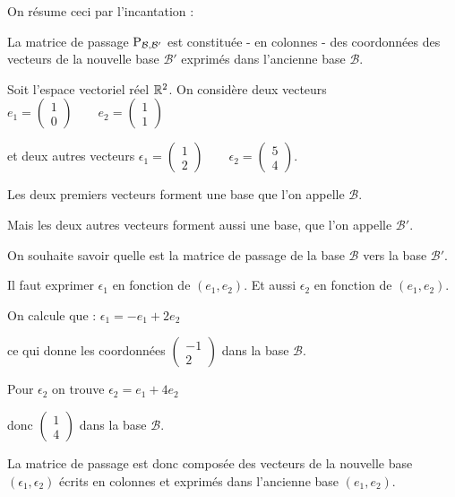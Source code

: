 \change
On résume ceci par l'incantation :

La matrice de passage $\mathop{\text{P}}\nolimits_{\mathcal{B},\mathcal{B'}}$ est constituée - en colonnes - des
coordonnées des vecteurs de la nouvelle base $\mathcal{B}'$
exprimés dans l'ancienne base $\mathcal{B}$. 


\diapo


Soit l'espace vectoriel réel $\mathbb{R}^2$.
On considère deux vecteurs 
$
e_1 = \begin{pmatrix}1\\0\end{pmatrix} \qquad
e_2 = \begin{pmatrix}1\\1\end{pmatrix}$

\change
et deux autres vecteurs 
$
\epsilon_1 = \begin{pmatrix}1\\2\end{pmatrix} \qquad
\epsilon_2 = \begin{pmatrix}5\\4\end{pmatrix}.$


\change
Les deux premiers vecteurs forment une base que l'on appelle $\mathcal{B}$.

\change
Mais les deux autres vecteurs forment aussi une base,
que l'on appelle $\mathcal{B}'$.

\change
On souhaite savoir quelle est la matrice de passage de la base $\mathcal{B}$ vers 
la base $\mathcal{B}'$.

\change
Il faut exprimer $\epsilon_1$ en fonction de $(e_1,e_2)$.
Et aussi $\epsilon_2$ en fonction de $(e_1,e_2)$.

\change
On calcule que :
$\epsilon_1 = -e_1+2e_2$

\change
ce qui donne les coordonnées $\begin{pmatrix}-1\\2\end{pmatrix}$ dans la base ${\mathcal{B}}$.

\change
Pour $\epsilon_2$ on trouve $\epsilon_2 = e_1+4e_2$

\change
donc $\begin{pmatrix}1\\4\end{pmatrix}$ dans la base ${\mathcal{B}}$.

\change
La matrice de passage est donc composée des vecteurs de la nouvelle base $(\epsilon_1,\epsilon_2)$
écrits en colonnes et exprimés dans l'ancienne base $(e_1,e_2)$.

